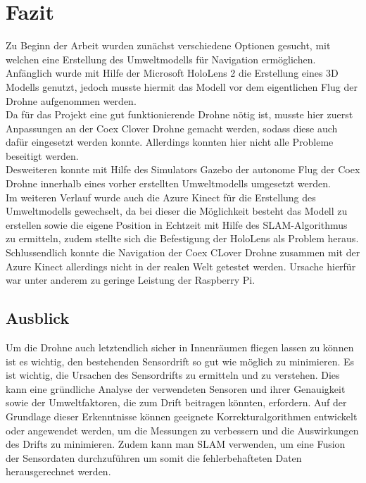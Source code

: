 \chapter{Fazit}
Zu Beginn der Arbeit wurden zunächst verschiedene Optionen gesucht, mit welchen eine Erstellung des Umweltmodells für Navigation ermöglichen. Anfänglich wurde mit Hilfe der Microsoft HoloLens 2 die Erstellung eines 3D Modells genutzt, jedoch musste hiermit das Modell vor dem eigentlichen Flug der Drohne aufgenommen werden. \\
Da für das Projekt eine gut funktionierende Drohne nötig ist, musste hier zuerst Anpassungen an der Coex Clover Drohne gemacht werden, sodass diese auch dafür eingesetzt werden konnte. Allerdings konnten hier nicht alle Probleme beseitigt werden.\\ 
Desweiteren konnte mit Hilfe des Simulators Gazebo der autonome Flug der Coex Drohne innerhalb eines vorher erstellten Umweltmodells umgesetzt werden. \\
Im weiteren Verlauf wurde auch die Azure Kinect für die Erstellung des Umweltmodells gewechselt, da bei dieser die Möglichkeit besteht das Modell zu erstellen sowie die eigene Position in Echtzeit mit Hilfe des SLAM-Algorithmus zu ermitteln, zudem stellte sich die Befestigung der HoloLens als Problem heraus. \\ 
Schlussendlich konnte die Navigation der Coex CLover Drohne zusammen mit der Azure Kinect allerdings nicht in der realen Welt getestet werden. Ursache hierfür war unter anderem zu geringe Leistung der Raspberry Pi.



\section{Ausblick}
Um die Drohne auch letztendlich sicher in Innenräumen fliegen lassen zu können ist es wichtig, den bestehenden Sensordrift so gut wie möglich zu minimieren. Es ist wichtig, die Ursachen des Sensordrifts zu ermitteln und zu verstehen. Dies kann eine gründliche Analyse der verwendeten Sensoren und ihrer Genauigkeit sowie der Umweltfaktoren, die zum Drift beitragen könnten, erfordern. Auf der Grundlage dieser Erkenntnisse können geeignete Korrekturalgorithmen entwickelt oder angewendet werden, um die Messungen zu verbessern und die Auswirkungen des Drifts zu minimieren. Zudem kann man SLAM verwenden, um eine Fusion der Sensordaten durchzuführen um somit die fehlerbehafteten Daten herausgerechnet werden. 

